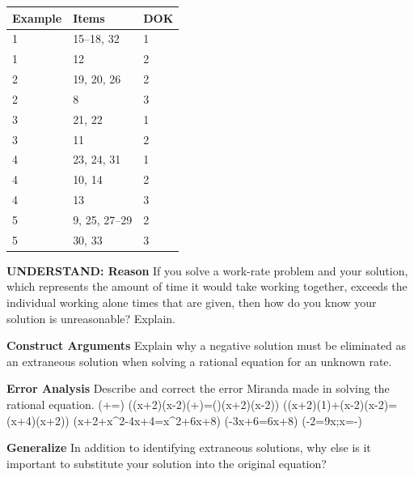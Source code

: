 \documentclass{article}
\newenvironment{item-analysis}{}{}      %
\newenvironment{practice}[2]{}{}        %
\newcommand{\answer}[1]{}               %
\newcommand{\te}[1]{}                   %
\begin{document}
\begin{item-analysis}
\begin{tabular}{lll}
\toprule
Example & Items & DOK \\
\midrule
1 & 15--18, 32 & 1 \\
1 & 12 & 2 \\
2 & 19, 20, 26 & 2 \\
2 & 8 & 3 \\
3 & 21, 22 & 1 \\
3 & 11 & 2 \\
4 & 23, 24, 31 & 1 \\
4 & 10, 14 & 2 \\
4 & 13 & 3 \\
5 & 9, 25, 27--29 & 2 \\
5 & 30, 33 & 3 \\
\bottomrule
\end{tabular}
\end{item-analysis}
\begin{practice}{8}{3}
\textbf{UNDERSTAND: Reason} If you solve a work-rate problem and your solution, which represents the amount of time it would take working together, exceeds the individual working alone times that are given, then how do you know your solution is unreasonable? Explain.
\answer{The time it takes working combined should be less than any of the individual times.}
\end{practice}
\begin{practice}{9}{2}
\textbf{Construct Arguments} Explain why a negative solution must be eliminated as an extraneous solution when solving a rational equation for an unknown rate.
\answer{The rate must be positive.}
\end{practice}
\begin{practice}{10}{2}
\textbf{Error Analysis} Describe and correct the error Miranda made in solving the rational equation.
(+=)
((x+2)(x-2)(+)=()(x+2)(x-2))
((x+2)(1)+(x-2)(x-2)=(x+4)(x+2))
(x+2+x^2-4x+4=x^2+6x+8)
(-3x+6=6x+8)
(-2=9x;x=-)
\te{Red X marks the work.}
\answer{In the third step of her work, she incorrectly uses (x+4) rather than (x-4) on the right-hand side of the equation. This throws off every step thereafter; therefore, the solution is incorrect.}
\end{practice}
\begin{practice}{11}{2}
\textbf{Generalize} In addition to identifying extraneous solutions, why else is it important to substitute your solution into the original equation?
\answer{Verify that students' answers are correct.}
\end{practice}
\end{document}
